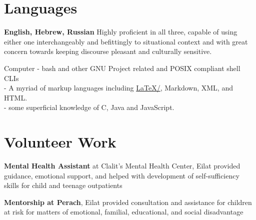 \section{Languages}

{\textbf{English, Hebrew, Russian}}
{Highly proficient in all three, capable of using either one interchangeably and befittingly to situational context and with great concern towards keeping discourse pleasant and culturally sensitive.}
{}

{Computer}
{- bash and other GNU Project related and POSIX compliant shell CLIs \\
- A myriad of markup languages including \href{https://github.com/kiril-u/cv/blob/main/cv-a/main.tex}{\LaTeX/\XeTeX}, Markdown, XML, and HTML. \\
- some superficial knowledge of C, Java and JavaScript.} \\
{}
\section{Volunteer Work}


{\textbf{Mental Health Assistant} at Clalit's Mental Health Center, Eilat}
{provided guidance, emotional support, and helped with development of self-sufficiency skills for child and teenage outpatients}
{}

{\textbf{Mentorship at Perach}, Eilat}
{provided consultation and assistance for children at risk for matters of emotional, familial, educational, and social disadvantage}
{} 
\unsetLTR
